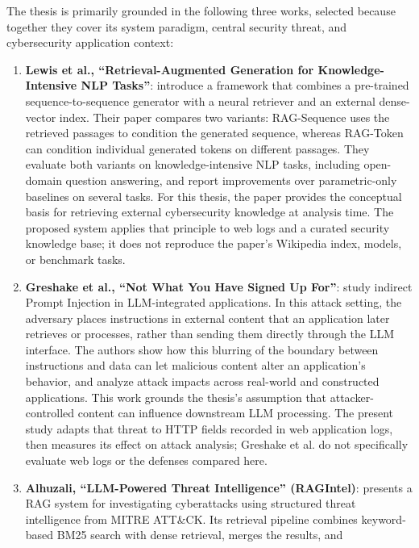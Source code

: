 The thesis is primarily grounded in the following three works, selected
because together they cover its system paradigm, central security threat,
and cybersecurity application context:

\begin{enumerate}
\def\labelenumi{\arabic{enumi}.}
\tightlist
\setlength{\itemsep}{0.7em}
\item
  \textbf{Lewis et al., ``Retrieval-Augmented Generation for Knowledge-Intensive
  NLP Tasks''}: introduce a framework that combines a pre-trained
  sequence-to-sequence generator with a neural retriever and an external
  dense-vector index. Their paper compares two variants: RAG-Sequence uses
  the retrieved passages to condition the generated sequence, whereas
  RAG-Token can condition individual generated tokens on different
  passages. They evaluate both variants on knowledge-intensive NLP tasks,
  including open-domain question answering, and report improvements over
  parametric-only baselines on several tasks. For this thesis, the paper
  provides the conceptual basis for retrieving external cybersecurity
  knowledge at analysis time. The proposed system applies that principle
  to web logs and a curated security knowledge base; it does not reproduce
  the paper's Wikipedia index, models, or benchmark tasks.
\item
  \textbf{Greshake et al., ``Not What You Have Signed Up For''}: study
  indirect Prompt Injection in LLM-integrated applications. In this attack
  setting, the adversary places instructions in external content that an
  application later retrieves or processes, rather than sending them
  directly through the LLM interface. The authors show how this blurring of
  the boundary between instructions and data can let malicious content
  alter an application's behavior, and analyze attack impacts across
  real-world and constructed applications. This work grounds the thesis's
  assumption that attacker-controlled content can influence downstream LLM
  processing. The present study adapts that threat to HTTP fields recorded
  in web application logs, then measures its effect on attack analysis;
  Greshake et al. do not specifically evaluate web logs or the defenses
  compared here.
\item
  \textbf{Alhuzali, ``LLM-Powered Threat Intelligence'' (RAGIntel)}:
  presents a RAG system for investigating cyberattacks using structured
  threat intelligence from MITRE ATT\&CK. Its retrieval pipeline combines
  keyword-based BM25 search with dense retrieval, merges the results, and

\end{enumerate}
